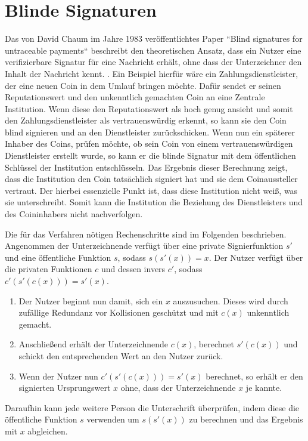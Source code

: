 \documentclass[11pt,a4paper]{scrreprt}
\begin{document}
\section{Blinde Signaturen}
\label{sec:blindSig}
Das von David Chaum im Jahre 1983 veröffentlichtes Paper ``Blind signatures for untraceable payments`` beschreibt den theoretischen Ansatz, dass ein Nutzer eine verifizierbare Signatur für eine Nachricht erhält, ohne dass der Unterzeichner den Inhalt der Nachricht kennt. \cite{chaum1983blind}. Ein Beispiel hierfür wäre ein Zahlungsdienstleister, der eine neuen Coin in dem Umlauf bringen möchte. Dafür sendet er seinen Reputationswert und den unkenntlich gemachten Coin an eine Zentrale Institution. Wenn diese den Reputationswert als hoch genug ansieht und somit den Zahlungsdienstleister als vertrauenswürdig erkennt, so kann sie den Coin blind signieren und an den Dienstleister zurückschicken. Wenn nun ein späterer Inhaber des Coins, prüfen möchte, ob sein Coin von einem vertrauenswürdigen Dienstleister erstellt wurde, so kann er die blinde Signatur mit dem öffentlichen Schlüssel der Institution entschlüsseln. Das Ergebnis dieser Berechnung zeigt, dass die Institution den Coin tatsächlich signiert hat und sie dem Coinaussteller vertraut. Der hierbei essenzielle Punkt ist, dass diese Institution nicht weiß, was sie unterschreibt. Somit kann die Institution die Beziehung des Dienstleisters und des Coininhabers nicht nachverfolgen. 

Die für das Verfahren nötigen Rechenschritte sind im Folgenden beschrieben. Angenommen der Unterzeichnende verfügt über eine private Signierfunktion $s'$ und eine öffentliche Funktion $s$, sodass $s(s'(x)) = x$. Der Nutzer verfügt über die privaten Funktionen $c$ und dessen invers $c'$, sodass $c'(s'(c(x))) = s'(x)$. 
\begin{enumerate}
    \item Der Nutzer beginnt nun damit, sich ein $x$ auszusuchen. Dieses wird durch zufällige Redundanz vor Kollisionen geschützt und mit $c(x)$ unkenntlich gemacht.
    \item Anschließend erhält der Unterzeichnende $c(x)$, berechnet $s'(c(x))$ und schickt den entsprechenden Wert an den Nutzer zurück.
    \item Wenn der Nutzer nun $c'(s'(c(x))) = s'(x)$ berechnet, so erhält er den signierten Ursprungswert $x$ ohne, dass der Unterzeichnende $x$ je kannte.
\end{enumerate}
Daraufhin kann jede weitere Person die Unterschrift überprüfen, indem diese die öffentliche Funktion $s$ verwenden um $s(s'(x))$ zu berechnen und das Ergebnis mit $x$ abgleichen. 
\end{document}
